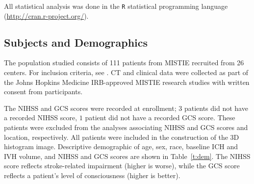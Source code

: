 \documentclass[10pt]{article}\usepackage[]{graphicx}\usepackage[]{color}
\begin{document}
All statistical analysis was done in the \verb|R| statistical programming language (\url{http://cran.r-project.org/}).  

\subsection{Subjects and Demographics}
The population studied consists of 111 patients from MISTIE recruited from 26 centers.  For inclusion criteria, see \citet{mould_minimally_2013}. CT and clinical data were collected as part of the Johns Hopkins Medicine IRB-approved MISTIE research studies with written consent from participants.  

%
                 
The NIHSS and GCS scores were recorded at enrollment; $3$ patients did not have a recorded NIHSS score, $1$ patient did not have a recorded GCS score.  These patients were excluded from the analyses associating NIHSS and GCS scores and location, respectively.  All patients were included in the construction of the 3D histogram image.  %
Descriptive demographic of age, sex, race, baseline ICH and IVH volume, and NIHSS and GCS scores are shown in Table~\ref{t:dem}. The NIHSS score reflects stroke-related impairment (higher is worse), while the GCS score reflects a patient's level of consciousness (higher is better).  
\end{document}
